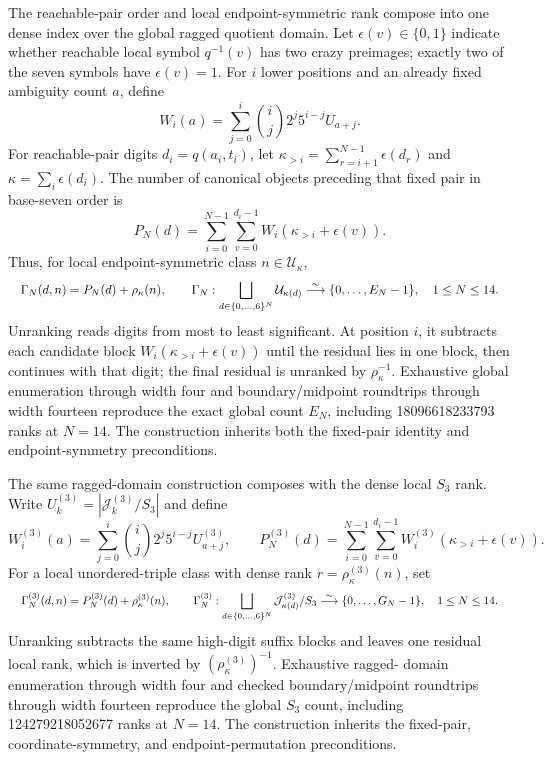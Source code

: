 \documentclass{article}
\newcommand{\fitmath}[1]{\resizebox{0.99\linewidth}{!}{$\displaystyle #1$}}
\begin{document}
The reachable-pair order and local endpoint-symmetric rank compose into one
dense index over the global ragged quotient domain. Let
$\epsilon(v)\in\{0,1\}$ indicate whether reachable local symbol $q^{-1}(v)$ has
two crazy preimages; exactly two of the seven symbols have $\epsilon(v)=1$.
For $i$ lower positions and an already fixed ambiguity count $a$, define
\[
  W_i(a)=\sum_{j=0}^{i}\binom{i}{j}2^j5^{i-j}U_{a+j}.
\]
For reachable-pair digits $d_i=q(a_i,t_i)$, let
$\kappa_{>i}=\sum_{r=i+1}^{N-1}\epsilon(d_r)$ and
$\kappa=\sum_i\epsilon(d_i)$. The number of canonical objects preceding that
fixed pair in base-seven order is
\[
  P_N(d)=\sum_{i=0}^{N-1}\sum_{v=0}^{d_i-1}
    W_i\!\left(\kappa_{>i}+\epsilon(v)\right).
\]
Thus, for local endpoint-symmetric class $n\in\mathcal U_\kappa$,
\begin{equation}
  \fitmath{%
    \Gamma_N(d,n)=P_N(d)+\rho_\kappa(n),\qquad
    \Gamma_N:\bigsqcup_{d\in\{0,\ldots,6\}^N}\mathcal U_{\kappa(d)}
      \overset{\sim}{\longrightarrow}\{0,\ldots,E_N-1\},
    \quad 1\leq N\leq14.
  }
  \label{eq:optimization-crazy-global-endpoint-symmetric-pair-ranking}
\end{equation}
Unranking reads digits from most to least significant. At position $i$, it
subtracts each candidate block
$W_i(\kappa_{>i}+\epsilon(v))$ until the residual lies in one block, then
continues with that digit; the final residual is unranked by $\rho_\kappa^{-1}$.
Exhaustive global enumeration through width four and boundary/midpoint
roundtrips through width fourteen reproduce the exact global count $E_N$,
including 18096618233793 ranks at $N=14$. The construction inherits both the
fixed-pair identity and endpoint-symmetry preconditions.

The same ragged-domain construction composes with the dense local $S_3$ rank.
Write $U^{(3)}_k=|\mathcal J^{(3)}_k/S_3|$ and define
\[
  W^{(3)}_i(a)=\sum_{j=0}^{i}\binom{i}{j}2^j5^{i-j}U^{(3)}_{a+j},
  \qquad
  P^{(3)}_N(d)=\sum_{i=0}^{N-1}\sum_{v=0}^{d_i-1}
    W^{(3)}_i\!\left(\kappa_{>i}+\epsilon(v)\right).
\]
For a local unordered-triple class with dense rank
$r=\rho^{(3)}_\kappa(n)$, set
\begin{equation}
  \fitmath{%
    \Gamma^{(3)}_N(d,n)=P^{(3)}_N(d)+\rho^{(3)}_\kappa(n),
    \qquad
    \Gamma^{(3)}_N:
      \bigsqcup_{d\in\{0,\ldots,6\}^N}\mathcal J^{(3)}_{\kappa(d)}/S_3
      \overset{\sim}{\longrightarrow}\{0,\ldots,G_N-1\},
    \quad 1\leq N\leq14.
  }
  \label{eq:optimization-crazy-global-unordered-triple-ranking}
\end{equation}
Unranking subtracts the same high-digit suffix blocks and leaves one residual
local rank, which is inverted by $(\rho^{(3)}_\kappa)^{-1}$. Exhaustive ragged-
domain enumeration through width four and checked boundary/midpoint roundtrips
through width fourteen reproduce the global $S_3$ count, including
124279218052677 ranks at $N=14$. The construction inherits the fixed-pair,
coordinate-symmetry, and endpoint-permutation preconditions.
\end{document}
